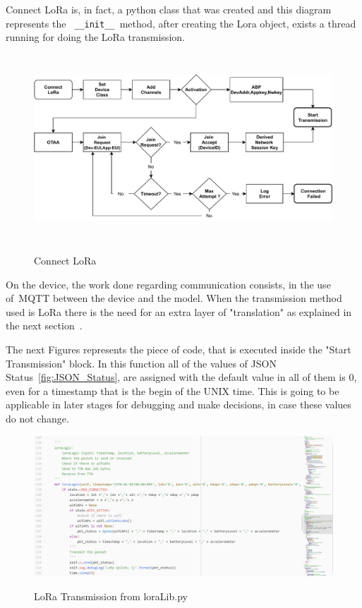 Connect LoRa is, in fact, a python class that was created and this diagram represents the \verb| __init__ |method, after creating the Lora object, exists a thread running for doing the LoRa transmission.\newline
\begin{figure}[htbp]
  \centering
  
    {\includegraphics[height=7cm,width=\linewidth]{Chapters/Figures/ConnectLoRa.pdf}}%
 
  \caption{Connect LoRa}
  \label{fig:ConnectLoRa}
\end{figure}

On the device, the work done regarding communication consists, in the use of~\gls{MQTT} between the device and the model. When the transmission method used is LoRa there is the need for an extra layer of "translation" as explained in the next section~.

\newpage
The next Figures represents the piece of code, that is executed inside the "Start Transmission"  block. In this function all of the values of JSON Status~\ref{fig:JSON_Status}, are assigned with the default value in all of them is 0, even for a timestamp that is the begin of the UNIX time. This is going to be applicable in later stages for debugging and make decisions, in case these values do not change.
\begin{figure}[htbp]
  \centering
  
    {\includegraphics[width=\linewidth]{Chapters/Figures/loralibwhite.JPG}}%
 
  \caption{LoRa Transmission from loraLib.py~\cite{githubcode}}
  \label{fig:LoRa_Transmit}
\end{figure}

